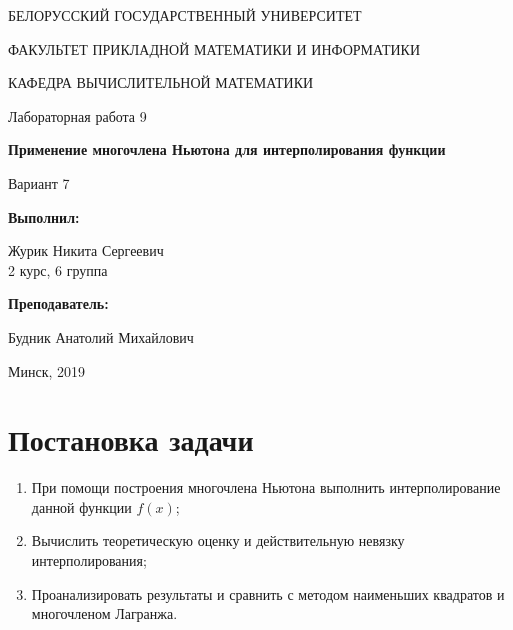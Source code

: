 \documentclass[14pt, a4paper]{article}
\begin{document}
\begin{titlepage}
\begin{center}
\large{БЕЛОРУССКИЙ ГОСУДАРСТВЕННЫЙ УНИВЕРСИТЕТ 

ФАКУЛЬТЕТ ПРИКЛАДНОЙ МАТЕМАТИКИ И ИНФОРМАТИКИ

КАФЕДРА ВЫЧИСЛИТЕЛЬНОЙ МАТЕМАТИКИ}
\end{center}
\vspace*{\fill}
\begin{center}
Лабораторная работа 9

\large{\textbf{Применение многочлена Ньютона для интерполирования функции}}

Вариант 7
\end{center}
\begin{flushright}
\textbf{Выполнил:}

Журик Никита Сергеевич \\ 2 курс, 6 группа

\textbf{Преподаватель:}

Будник Анатолий Михайлович
\end{flushright}
\vspace*{\fill}
\begin{center}
Минск, 2019
\end{center}
\end{titlepage}

\tableofcontents
\newpage

\newpage
{}

  \section{Постановка задачи}
    \begin{enumerate}
      \item
      При помощи построения многочлена Ньютона выполнить интерполирование данной функции $f(x)$;
      \item
      Вычислить теоретическую оценку и действительную невязку интерполирования;
      \item
      Проанализировать результаты и сравнить с методом наименьших квадратов и многочленом Лагранжа.
    \end{enumerate}
\end{document}
